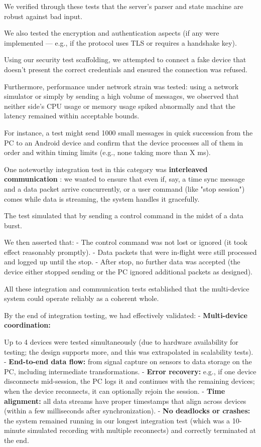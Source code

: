 {{We verified through these tests that the server's parser and state machine are robust
against bad input.

We also tested the encryption and authentication aspects (if any were implemented ---
e.g., if the protocol uses TLS or requires a handshake key).

Using our security test scaffolding, we attempted to connect a fake device that
doesn't present the correct credentials and ensured the connection was refused.

Furthermore, performance under network strain was tested: using a network simulator
or simply by sending a high volume of messages, we observed that neither side's CPU
usage or memory usage spiked abnormally and that the latency remained within
acceptable bounds.

For instance, a test might send 1000 small messages in quick succession from the PC
to an Android device and confirm that the device processes all of them in order and
within timing limits (e.g., none taking more than X ms).

One noteworthy integration test in this category was \textbf{interleaved
communication}
: we wanted to ensure that even if, say, a time sync message and a data packet arrive
concurrently, or a user command (like "stop session") comes while data is streaming,
the system handles it gracefully.

The test simulated that by sending a control command in the midst of a data burst.

We then asserted that: - The control command was not lost or ignored (it took effect
reasonably promptly).  - Data packets that were in-flight were still processed and
logged up until the stop.  - After stop, no further data was accepted (the device
either stopped sending or the PC ignored additional packets as designed).

All these integration and communication tests established that the multi-device
system could operate reliably as a coherent whole.

By the end of integration testing, we had effectively validated: -
\textbf{Multi-device coordination:}

Up to 4 devices were tested simultaneously (due to hardware availability for testing;
the design supports more, and this was extrapolated in scalability tests).  -
\textbf{End-to-end data flow:}
 from signal capture on sensors to data storage on the PC, including intermediate
 transformations.  - \textbf{Error recovery:}
 e.g., if one device disconnects mid-session, the PC logs it and continues with the
 remaining devices; when the device reconnects, it can optionally rejoin the session.
 - \textbf{Time alignment:}
 all data streams have proper timestamps that align across devices (within a few
 milliseconds after synchronization).  - \textbf{No deadlocks or crashes:}
 the system remained running in our longest integration test (which was a 10-minute
 simulated recording with multiple reconnects) and correctly terminated at the end.

}}
